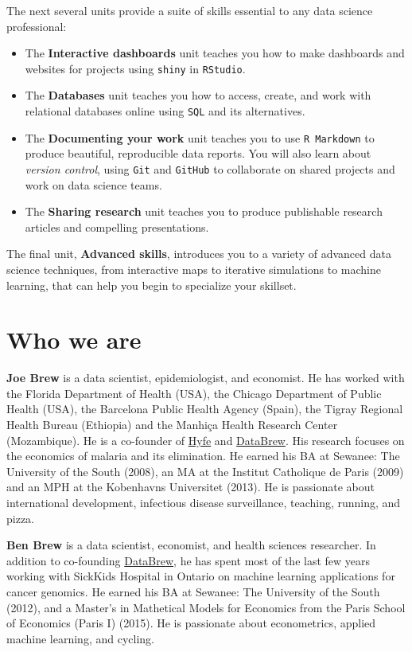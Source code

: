 \documentclass[
]{book}
\begin{document}
The next several units provide a suite of skills essential to any data science professional:

\begin{itemize}
\item
  The \textbf{Interactive dashboards} unit teaches you how to make dashboards and websites for projects using \texttt{shiny} in \texttt{RStudio}.
\item
  The \textbf{Databases} unit teaches you how to access, create, and work with relational databases online using \texttt{SQL} and its alternatives.
\item
  The \textbf{Documenting your work} unit teaches you to use \texttt{R\ Markdown} to produce beautiful, reproducible data reports. You will also learn about \emph{version control}, using \texttt{Git} and \texttt{GitHub} to collaborate on shared projects and work on data science teams.
\item
  The \textbf{Sharing research} unit teaches you to produce publishable research articles and compelling presentations.
\end{itemize}

The final unit, \textbf{Advanced skills}, introduces you to a variety of advanced data science techniques, from interactive maps to iterative simulations to machine learning, that can help you begin to specialize your skillset.

\hypertarget{who-we-are}{%
\section*{Who we are}\label{who-we-are}}

\textbf{Joe Brew} is a data scientist, epidemiologist, and economist. He has worked with the Florida Department of Health (USA), the Chicago Department of Public Health (USA), the Barcelona Public Health Agency (Spain), the Tigray Regional Health Bureau (Ethiopia) and the Manhiça Health Research Center (Mozambique). He is a co-founder of \href{www.hyfe.ai}{Hyfe} and \href{www.databrew.cc}{DataBrew}. His research focuses on the economics of malaria and its elimination. He earned his BA at Sewanee: The University of the South (2008), an MA at the Institut Catholique de Paris (2009) and an MPH at the Kobenhavns Universitet (2013). He is passionate about international development, infectious disease surveillance, teaching, running, and pizza.

\textbf{Ben Brew} is a data scientist, economist, and health sciences researcher. In addition to co-founding \href{www.databrew.cc}{DataBrew}, he has spent most of the last few years working with SickKids Hospital in Ontario on machine learning applications for cancer genomics. He earned his BA at Sewanee: The University of the South (2012), and a Master's in Mathetical Models for Economics from the Paris School of Economics (Paris I) (2015). He is passionate about econometrics, applied machine learning, and cycling.
\end{document}
